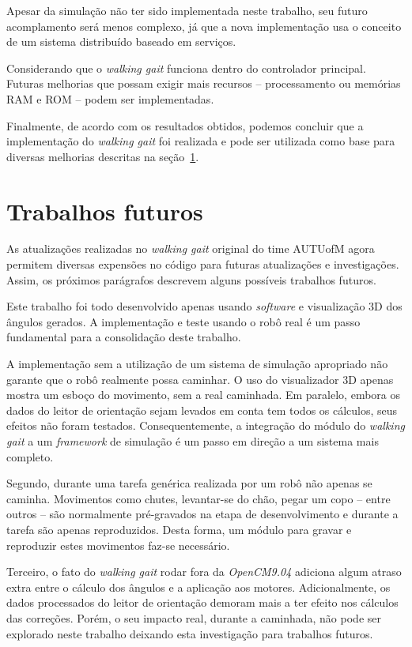 Apesar da simulação não ter sido implementada neste trabalho, seu futuro acomplamento será menos complexo, já que a nova implementação usa o conceito de um sistema distribuído baseado em serviços.

Considerando que o \textit{walking gait} funciona dentro do controlador principal. Futuras melhorias que possam exigir mais recursos -- processamento ou memórias RAM e ROM -- podem ser implementadas.

Finalmente, de acordo com os resultados obtidos, podemos concluir que a implementação do \textit{walking gait} foi realizada e pode ser utilizada como base para diversas melhorias descritas na seção~\ref{sec:conclusion:future}.

\section{Trabalhos futuros}
\label{sec:conclusion:future}

As atualizações realizadas no \textit{walking gait} original do time AUTUofM agora permitem diversas expensões no código para futuras atualizações e investigações. Assim, os próximos parágrafos descrevem alguns possíveis trabalhos futuros.

Este trabalho foi todo desenvolvido apenas usando \textit{software} e visualização 3D dos ângulos gerados. A implementação e teste usando o robô real é um passo fundamental para a consolidação deste trabalho.

A implementação sem a utilização de um sistema de simulação apropriado não garante que o robô realmente possa caminhar. O uso do visualizador 3D apenas mostra um esboço do movimento, sem a real caminhada. Em paralelo, embora os dados do leitor de orientação sejam levados em conta tem todos os cálculos, seus efeitos não foram testados. Consequentemente, a integração do módulo do \textit{walking gait} a um \textit{framework} de simulação é um passo em direção a um sistema mais completo.

Segundo, durante uma tarefa genérica realizada por um robô não apenas se caminha. Movimentos como chutes, levantar-se do chão, pegar um copo -- entre outros -- são normalmente pré-gravados na etapa de desenvolvimento e durante a tarefa são apenas reproduzidos. Desta forma, um módulo para gravar e reproduzir estes movimentos faz-se necessário.

Terceiro, o fato do \textit{walking gait} rodar fora da \textit{OpenCM9.04} adiciona algum atraso extra entre o cálculo dos ângulos e a aplicação aos motores. Adicionalmente, os dados processados do leitor de orientação demoram mais a ter efeito nos cálculos das correções. Porém, o seu impacto real, durante a caminhada, não pode ser explorado neste trabalho deixando esta investigação para trabalhos futuros.

